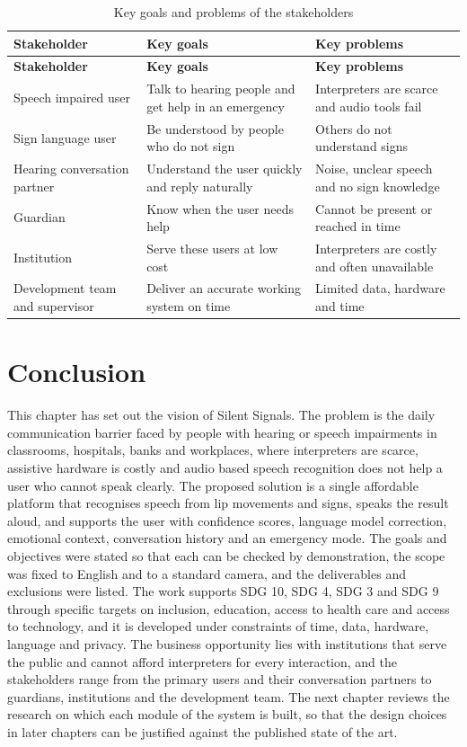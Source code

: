 \documentclass{FastFyp}
\begin{document}
\begingroup
\renewcommand{\arraystretch}{1.3}

\noindent
\begin{xltabular}{\linewidth}{|p{3.2cm}|X|X|}
\caption{Key goals and problems of the stakeholders}\label{tab:goals} \\
\hline
\textbf{Stakeholder} & \textbf{Key goals} & \textbf{Key problems} \\ \hline
\endfirsthead

\hline
\textbf{Stakeholder} & \textbf{Key goals} & \textbf{Key problems} \\ \hline
\endhead

Speech impaired user & Talk to hearing people and get help in an emergency & Interpreters are scarce and audio tools fail \\ \hline
Sign language user & Be understood by people who do not sign & Others do not understand signs \\ \hline
Hearing conversation partner & Understand the user quickly and reply naturally & Noise, unclear speech and no sign knowledge \\ \hline
Guardian & Know when the user needs help & Cannot be present or reached in time \\ \hline
Institution & Serve these users at low cost & Interpreters are costly and often unavailable \\ \hline
Development team and supervisor & Deliver an accurate working system on time & Limited data, hardware and time \\ \hline
\end{xltabular}
\endgroup

\section{Conclusion}
This chapter has set out the vision of Silent Signals. The problem is the daily communication barrier faced by people with hearing or speech impairments in classrooms, hospitals, banks and workplaces, where interpreters are scarce, assistive hardware is costly and audio based speech recognition does not help a user who cannot speak clearly. The proposed solution is a single affordable platform that recognises speech from lip movements and signs, speaks the result aloud, and supports the user with confidence scores, language model correction, emotional context, conversation history and an emergency mode. The goals and objectives were stated so that each can be checked by demonstration, the scope was fixed to English and to a standard camera, and the deliverables and exclusions were listed. The work supports SDG 10, SDG 4, SDG 3 and SDG 9 through specific targets on inclusion, education, access to health care and access to technology, and it is developed under constraints of time, data, hardware, language and privacy. The business opportunity lies with institutions that serve the public and cannot afford interpreters for every interaction, and the stakeholders range from the primary users and their conversation partners to guardians, institutions and the development team. The next chapter reviews the research on which each module of the system is built, so that the design choices in later chapters can be justified against the published state of the art.
\end{document}
